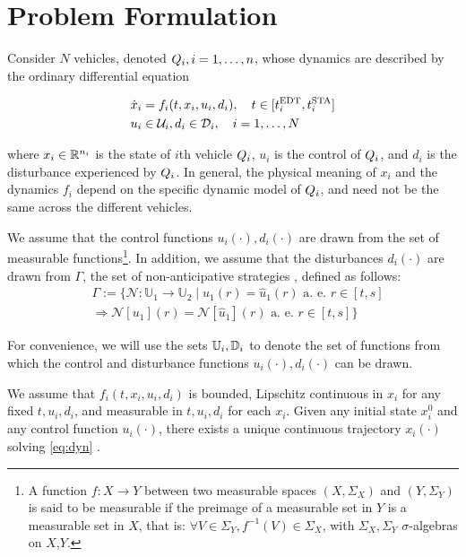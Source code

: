 \section{Problem Formulation \label{sec:formulation}}
Consider $N$ vehicles, denoted $Q_i, i = 1,\ldots,n$, whose dynamics are described by the ordinary differential equation

\begin{equation}
\label{eq:dyn}
\begin{aligned}
\dot{x}_i &= f_i(t, x_i, u_i, d_i), \quad t \in [t^\text{EDT}_i, t^\text{STA}_i] \\
u_i &\in \mathcal{U}_i, d_i \in \mathcal{D}_i, \quad i = 1,\ldots, N
\end{aligned}
\end{equation}

\noindent where $x_i \in \mathbb{R}^{n_i}$ is the state of $i$th vehicle $Q_i$, $u_i$ is the control of $Q_i$, and $d_i$ is the disturbance experienced by $Q_i$. In general, the physical meaning of $x_i$ and the dynamics $f_i$ depend on the specific dynamic model of $Q_i$, and need not be the same across the different vehicles.

We assume that the control functions $u_i(\cdot), d_i(\cdot)$ are drawn from the set of measurable functions\footnote{
A function $f:X\to Y$ between two measurable spaces $(X,\Sigma_X)$ and $(Y,\Sigma_Y)$ is said to be measurable if the preimage of a measurable set in $Y$ is a measurable set in $X$, that is: $\forall V\in\Sigma_Y, f^{-1}(V)\in\Sigma_X$, with $\Sigma_X,\Sigma_Y$ $\sigma$-algebras on $X$,$Y$.}. In addition, we assume that the disturbances $d_i(\cdot)$ are drawn from $\Gamma$, the set of non-anticipative strategies \cite{Mitchell05}, defined as follows:
\begin{equation}
\begin{aligned}
& \Gamma := \{\mathcal{N}: \mathbb{U}_1 \rightarrow \mathbb{U}_2 \mid  u_1(r) = \hat{u}_1(r) \text{ a. e. } r\in[t,s] \\
& \Rightarrow \mathcal{N}[u_1](r) = \mathcal{N}[\hat{u}_1](r) \text{ a. e. } r\in[t,s]\}
\end{aligned}
\end{equation}

For convenience, we will use the sets $\mathbb{U}_i, \mathbb{D}_i$ to denote the set of functions from which the control and disturbance functions $u_i(\cdot), d_i(\cdot)$ can be drawn.

We assume that $f_i(t,x_i, u_i, d_i)$ is bounded, Lipschitz continuous in $x_i$ for any fixed $t, u_i, d_i$, and measurable in $t, u_i, d_i$ for each $x_i$. Given any initial state $x_i^0$ and any control function $u_i(\cdot)$, there exists a unique continuous trajectory $x_i(\cdot)$ solving \eqref{eq:dyn} \cite{Coddington55}.

